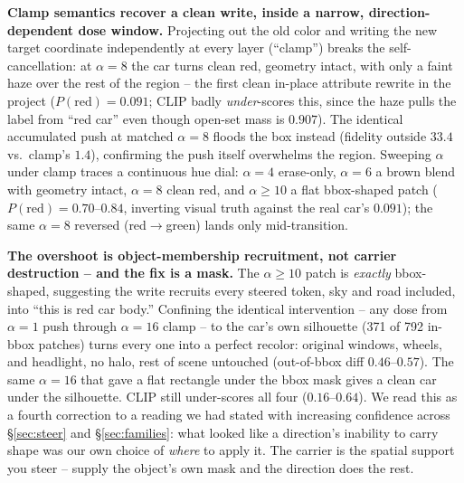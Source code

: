 \documentclass[10pt,twocolumn,letterpaper]{article}
\begin{document}
\textbf{Clamp semantics recover a clean write, inside a narrow,
direction-dependent dose window.} Projecting out the old color and
writing the new target coordinate independently at every layer
(``clamp'') breaks the self-cancellation: at $\alpha{=}8$ the car turns
clean red, geometry intact, with only a faint haze over the rest of the
region -- the first clean in-place attribute rewrite in the project
($P(\text{red})=0.091$; CLIP badly \emph{under}-scores this, since the
haze pulls the label from ``red car'' even though open-set mass is
$0.907$). The identical accumulated push at matched $\alpha{=}8$ floods
the box instead (fidelity outside $33.4$ vs.\ clamp's $1.4$), confirming
the push itself overwhelms the region. Sweeping $\alpha$ under clamp
traces a continuous hue dial: $\alpha{=}4$ erase-only, $\alpha{=}6$ a
brown blend with geometry intact, $\alpha{=}8$ clean red, and
$\alpha{\ge}10$ a flat bbox-shaped patch ($P(\text{red})=0.70$--$0.84$,
inverting visual truth against the real car's $0.091$); the same
$\alpha{=}8$ reversed (red$\to$green) lands only mid-transition.

\textbf{The overshoot is object-membership recruitment, not carrier
destruction -- and the fix is a mask.} The $\alpha{\ge}10$ patch is
\emph{exactly} bbox-shaped, suggesting the write recruits every steered
token, sky and road included, into ``this is red car body.'' Confining
the identical intervention -- any dose from $\alpha{=}1$ push through
$\alpha{=}16$ clamp -- to the car's own silhouette (371 of 792 in-bbox
patches) turns every one into a perfect recolor: original windows,
wheels, and headlight, no halo, rest of scene untouched (out-of-bbox
diff $0.46$--$0.57$). The same $\alpha{=}16$ that gave a flat rectangle
under the bbox mask gives a clean car under the silhouette. CLIP still
under-scores all four ($0.16$--$0.64$). We read this as a fourth
correction to a reading we had stated with increasing confidence across
\S\ref{sec:steer} and \S\ref{sec:families}: what looked like a
direction's inability to carry shape was our own choice of \emph{where}
to apply it. The carrier is the spatial support you steer -- supply the
object's own mask and the direction does the rest.
\end{document}
